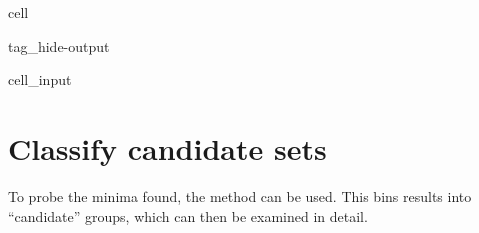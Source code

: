 \documentclass[letterpaper,table,10pt,english]{jupyterBook}
\begin{document}
\begin{sphinxuseclass}{cell}
\begin{sphinxuseclass}{tag_hide-output}\begin{sphinxVerbatimInput}

\begin{sphinxuseclass}{cell_input}
\begin{sphinxVerbatim}[commandchars=\\\{\}]
\PYG{p}{[}\PYG{p}{]}\PYG{p}{[}\PYG{p}{]}
\end{sphinxVerbatim}

\end{sphinxuseclass}\end{sphinxVerbatimInput}

\end{sphinxuseclass}
\end{sphinxuseclass}

\section{Classify candidate sets}
\label{\detokenize{part2/case-study-OCS_290723:classify-candidate-sets}}
\sphinxAtStartPar
To probe the minima found, the  method can be used. This bins results into “candidate” groups, which can then be examined in detail.
\end{document}
